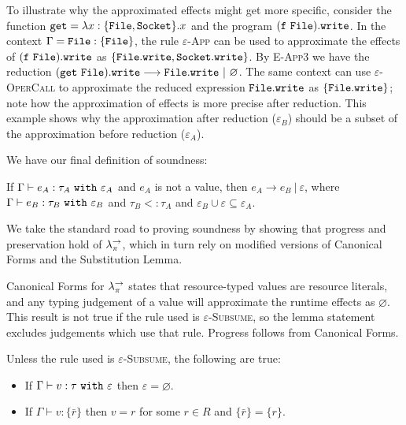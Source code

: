 To illustrate why the approximated effects might get more specific, consider the function $\mathtt{get} = \lambda x: \{ \mathtt{File, Socket} \} .x$ and the program $\mathtt{(f~File).write}$. In the context $\Gamma = \mathtt{File: \{ File \}}$, the rule \textsc{$\varepsilon$-App} can be used to approximate the effects of $\mathtt{(f~File).write}$ as $\{ \mathtt{File.write, Socket.write} \}$. By \textsc{E-App3} we have the reduction $\mathtt{(get~File).write} \longrightarrow \mathtt{File.write}~|~\varnothing$. The same context can use \textsc{$\varepsilon$-OperCall} to approximate the reduced expression $\mathtt{File.write}$ as $\{ \mathtt{File.write} \}$; note how the approximation of effects is more precise after reduction. This example shows why the approximation after reduction ($\varepsilon_B$) should be a subset of the approximation before reduction ($\varepsilon_A$).

We have our final definition of soundness:

\begin{theorem}[Soundness]
If $ \Gamma \vdash  e_A:  \tau_A~\mathtt{with}~ \varepsilon_A$ and $ e_A$ is not a value, then $e_A \longrightarrow e_B~|~\varepsilon$, where $ \Gamma \vdash e_B:  \tau_B~\mathtt{with}~ \varepsilon_B$ and $ \tau_B <:  \tau_A$ and $\varepsilon_B \cup \varepsilon \subseteq \varepsilon_A$.
\end{theorem}

We take the standard road to proving soundness by showing that progress and preservation hold of $\lambda^{\rightarrow}_{\pi}$, which in turn rely on modified versions of Canonical Forms and the Substitution Lemma.

Canonical Forms for $\lambda^{\rightarrow}_{\pi}$ states that resource-typed values are resource literals, and any typing judgement of a value will approximate the runtime effects as $\varnothing$. This result is not true if the rule used is \textsc{$\varepsilon$-Subsume}, so the lemma statement excludes judgements which use that rule. Progress follows from Canonical Forms.

\begin{lemma}
Unless the rule used is \textsc{$\varepsilon$-Subsume}, the following are true:
\begin{itemize}
	\setlength\itemsep{-0.7em}
	\item If $ \Gamma \vdash  v:  \tau~\mathtt{with}~ \varepsilon$ then $\varepsilon = \varnothing$.
	\item If $ \Gamma \vdash  v: \{ \bar r \}$ then $ v = r$ for some $r \in R$ and $\{ \bar r \} = \{ r \}$.
\end{itemize}
\end{lemma}

